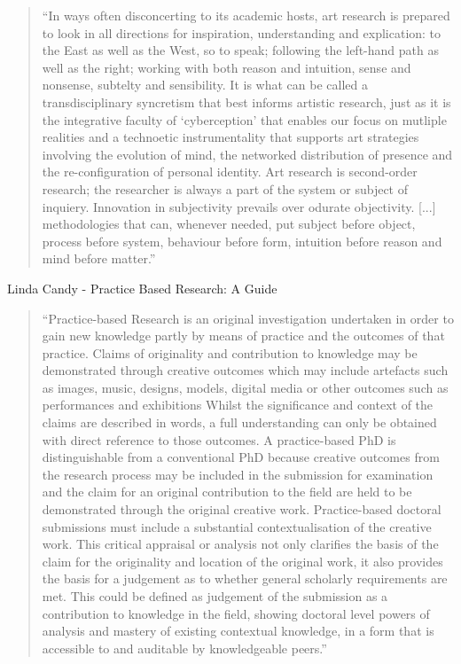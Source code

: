 \begin{quote}
  ``In ways often disconcerting to its academic hosts, art research is prepared to look in all directions for inspiration, understanding and explication: to the East as well as the West, so to speak; following the left-hand path as well as the right; working with both reason and intuition, sense and nonsense, subtelty and sensibility. It is what can be called a transdisciplinary syncretism that best informs artistic research, just as it is the integrative faculty of ‘cyberception’ that enables our focus on mutliple realities and a technoetic instrumentality that supports art strategies involving the evolution of mind, the networked distribution of presence and the re-configuration of personal identity. Art research is second-order research; the researcher is always a part of the system or subject of inquiery. Innovation in subjectivity prevails over odurate objectivity. [...] methodologies that can, whenever needed, put subject before object, process before system, behaviour before form, intuition before reason and mind before matter.''\autocite[Roy Ascott's preface in][p. vi]{Candy2011}
\end{quote}

Linda Candy - Practice Based Research: A Guide
\begin{quote}
  ``Practice-based Research is an original investigation undertaken in order to gain new knowledge partly by means of practice and the outcomes of that practice. Claims of originality and contribution to knowledge may be demonstrated through creative outcomes which may include artefacts such as images, music, designs, models, digital media or other outcomes such as performances and exhibitions Whilst the significance and context of the claims are described in words, a full understanding can only be obtained with direct reference to those outcomes. A practice-based PhD is distinguishable from a conventional PhD because creative outcomes from the research process may be included in the submission for examination and the claim for an original contribution to the field are held to be demonstrated through the original creative work. Practice-based doctoral submissions must include a substantial contextualisation of the creative work. This critical appraisal or analysis not only clarifies the basis of the claim for the originality and location of the original work, it also provides the basis for a judgement as to whether general scholarly requirements are met. This could be defined as judgement of the submission as a contribution to knowledge in the field, showing doctoral level powers of analysis and mastery of existing contextual knowledge, in a form that is accessible to and auditable by knowledgeable peers.'' \autocite{Candy2006}
\end{quote}


